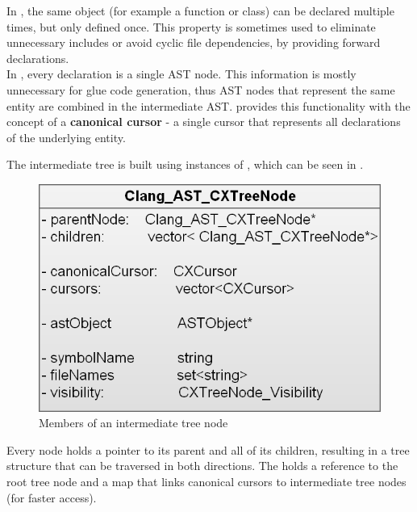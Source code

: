 In , the same object (for example a function or class) can be declared multiple times, but only defined once. This property is sometimes used to eliminate unnecessary includes or avoid cyclic file dependencies, by providing forward declarations.\\
In , every declaration is a single AST node. This information is mostly unnecessary for glue code generation, thus AST nodes that represent the same  entity are combined in the intermediate AST.  provides this functionality with the concept of a \textbf{canonical cursor} - a single cursor that represents all declarations of the underlying entity.

The intermediate tree is built using instances of , which can be seen in . 

\begin{figure}[h] %
	\centering
		\includegraphics[scale=0.3]{Images/CXTreeNode.png}
	\caption{Members of an intermediate tree node}
	\label{fig:CXTreeNode}
\end{figure}

Every node holds a pointer to its parent and all of its children, resulting in a tree structure that can be traversed in both directions. 
The  holds a reference to the root tree node and a map that links canonical cursors to intermediate tree nodes (for faster access).


